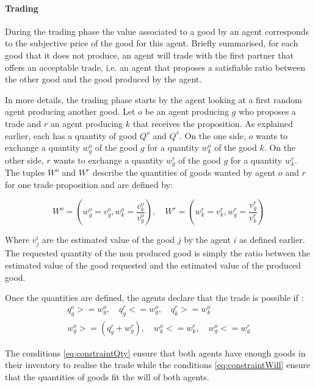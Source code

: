 \documentclass[a4paper]{article}
\begin{document}
\paragraph{Trading} 
During the trading phase the value associated to a good by an agent corresponds to the subjective price of the good for this agent. Briefly summarised, for each good that it does not produce, an agent will trade with the first partner that offers an acceptable trade, i.e. an agent that proposes a satisfiable ratio between the other good and the good produced by the agent. 

In more details, the trading phase starts by the agent looking at a first random agent producing another good. 
Let $o$ be an agent producing $g$ who proposes a trade and $r$ an agent producing $k$ that receives the proposition. As explained earlier, each has a quantity of good $Q^o$ and $Q^r$. On the one side, $o$ wants to exchange a quantity $w_g^o$ of the good $g$ for a quantity $w_k^o$ of the good $k$. On the other side, $r$ wants to exchange a quantity $w_g^r$ of the good $g$ for a quantity $w_k^r$. The tuples $W^o$ and $W^r$ describe the quantities of goods wanted by agent $o$ and $r$ for one trade proposition and are defined by:  

\begin{equation}
	 W^o=(w_g^o = v_g^o,w_k^o= \frac{v_k^o}{v_g^o}), \quad
	 W^r=(w_k^r = v_k^r,w_g^r= \frac{v_g^r}{v_k^r}) 
	 \label{eq:trade}
\end{equation}

 Where $v_j^i$ are the estimated value of the good $j$ by the agent $i$ as defined earlier. 
The requested quantity of the non produced good is simply the ratio between the estimated value of the good requested and the estimated value of the produced good.


Once the quantities are defined, the agents declare that the trade is possible if :
\begin{align}
q_g^o >= w_g^o,\quad q_g^r <= w_g^o,\quad q_k^r >= w_k^o \label{eq:constraintQty}\\
w_g^o>=(q_g^r+w_g^r),\quad w_k^o<=w_k^r,\quad w_g^o<=w_g^r \label{eq:constraintWill}
\end{align}


The conditions \ref{eq:constraintQty} ensure that both agents have enough goods in their inventory to realise the trade while the conditions \ref{eq:constraintWill} ensure that the quantities of goods fit the will of both agents.
\end{document}
